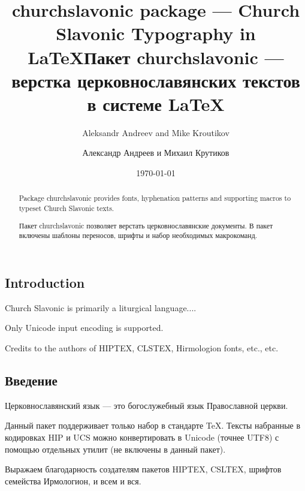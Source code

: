 \usepackage{churchslavonic}
\usepackage{hyperref}



\begin{EN}
\title{\textsf{churchslavonic} package --- Church Slavonic Typography in \LaTeX}
\author{Aleksandr Andreev and Mike Kroutikov}
\end{EN}

\begin{RU}
\title{Пакет \textsf{churchslavonic} --- верстка церковнославянских текстов в системе \LaTeX}
\author{Александр Андреев и Михаил Крутиков}
\end{RU}

\date{\today}
\maketitle

\begin{EN}
\begin{abstract}
Package \textsf{churchslavonic} provides fonts, hyphenation patterns and supporting macros to typeset
Church Slavonic texts.
\end{abstract}
\end{EN}

\begin{RU}
\begin{abstract}
Пакет \textsf{churchslavonic} позволяет верстать церковнославянские документы. В пакет включены шаблоны переносов,
шрифты и набор необходимых макрокоманд.
\end{abstract}
\end{RU}

\tableofcontents

\begin{EN}
\section*{Introduction}
Church Slavonic is primarily a liturgical language....

Only Unicode input encoding is supported.

Credits to the authors of HIPTEX, CLSTEX, Hirmologion fonts, etc., etc. 
\end{EN}

\begin{RU}
\section*{Введение}
Церковнославянский язык --- это богослужебный язык Православной церкви.

Данный пакет поддерживает только набор в стандарте TeX. Тексты набранные в кодировках HIP и UCS
можно конвертировать в Unicode (точнее UTF8) с помощью отдельных утилит (не включены в данный пакет).

Выражаем благодарность создателям пакетов HIPTEX, CSLTEX, шрифтов семейства Ирмологион, и всем и вся.
\end{RU}

